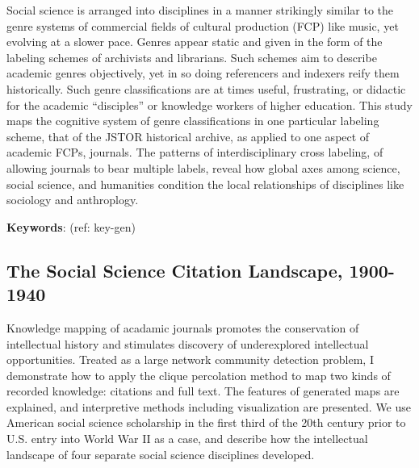 \documentclass[]{book}
\theoremstyle{definition}
\theoremstyle{definition}
\theoremstyle{definition}
\theoremstyle{remark}
\begin{document}
Social science is arranged into disciplines in a manner
strikingly similar to the genre systems of commercial fields of cultural
production (FCP) like music, yet evolving at a slower pace. Genres
appear static and given in the form of the labeling schemes of
archivists and librarians. Such schemes aim to describe academic genres
objectively, yet in so doing referencers and indexers reify them
historically. Such genre classifications are at times useful,
frustrating, or didactic for the academic ``disciples'' or knowledge
workers of higher education. This study maps the cognitive system of
genre classifications in one particular labeling scheme, that of the
JSTOR historical archive, as applied to one aspect of academic FCPs,
journals. The patterns of interdisciplinary cross labeling, of allowing
journals to bear multiple labels, reveal how global axes among science,
social science, and humanities condition the local relationships of
disciplines like sociology and anthroplogy.




\textbf{Keywords}: (ref: key-gen)

\hypertarget{the-social-science-citation-landscape-1900-1940}{%
\subsection*{The Social Science Citation Landscape,
1900-1940}\label{the-social-science-citation-landscape-1900-1940}}













Knowledge mapping of acadamic journals promotes the
conservation of intellectual history and stimulates discovery of
underexplored intellectual opportunities. Treated as a large network
community detection problem, I demonstrate how to apply the clique
percolation method to map two kinds of recorded knowledge: citations and
full text. The features of generated maps are explained, and
interpretive methods including visualization are presented. We use
American social science scholarship in the first third of the 20th
century prior to U.S. entry into World War II as a case, and describe
how the intellectual landscape of four separate social science
disciplines developed.
\end{document}
